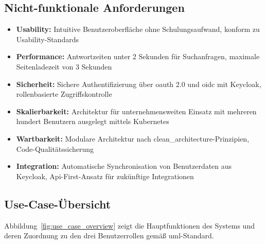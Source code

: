 \subsection{Nicht-funktionale Anforderungen}
\label{sec:nicht_funktionale_anforderungen}
\begin{itemize}
    \item \textbf{Usability:} Intuitive Benutzeroberfläche ohne Schulungsaufwand, konform zu Usability-Standards\cite{wcag}
    \item \textbf{Performance:} Antwortzeiten unter 2 Sekunden für Suchanfragen, maximale Seitenladezeit von 3 Sekunden\cite{web_performance}
    \item \textbf{Sicherheit:} Sichere Authentifizierung über \gls{oauth} 2.0 und \gls{oidc} mit Keycloak\cite{keycloak_docs}, rollenbasierte Zugriffskontrolle\cite{oauth2_spec}
    \item \textbf{Skalierbarkeit:} Architektur für unternehmensweiten Einsatz mit mehreren hundert Benutzern ausgelegt mittels Kubernetes\cite{kubernetes_docs}
    \item \textbf{Wartbarkeit:} Modulare Architektur nach \gls{clean_architecture}-Prinzipien, Code-Qualitätssicherung\cite{clean_architecture}
    \item \textbf{Integration:} Automatische Synchronisation von Benutzerdaten aus Keycloak\cite{keycloak_docs}, Api-First-Ansatz für zukünftige Integrationen\cite{api_design}
\end{itemize}

\subsection{Use-Case-Übersicht}

Abbildung~\ref{fig:use_case_overview} zeigt die Hauptfunktionen des Systems und deren Zuordnung zu den drei Benutzerrollen gemäß \gls{uml}-Standard\cite{uml_specification}.

